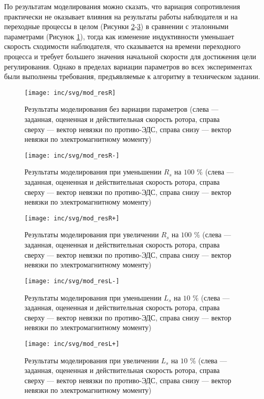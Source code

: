 По результатам моделирования можно сказать, что вариация сопротивления практически не оказывает влияния на результаты работы наблюдателя и на переходные процессы в целом (Рисунки \ref{pic:R-}-\ref{pic:R+}) в сравнении с эталонными параметрами (Рисунок \ref{pic:ideal}), тогда как изменение индуктивности уменьшает скорость сходимости наблюдателя, что сказывается на времени переходного процесса и требует большего значения начальной скорости для достижения цели регулирования. Однако в пределах вариации параметров во всех экспериментах были выполнены требования, предъявляемые к алгоритму в техническом задании.

\begin{figure}[!h]
\centering
\texttt{[image: inc/svg/mod\_resR]}
\caption{Результаты моделирования без вариации параметров (слева --- заданная, оцененная и действительная скорость ротора, справа сверху --- вектор невязки по противо-ЭДС, справа снизу --- вектор невязки по электромагнитному моменту)}
\label{pic:ideal}
\end{figure}

\begin{figure}[!h]
\centering
\texttt{[image: inc/svg/mod\_resR-]}
\caption{Результаты моделирования при уменьшении $R_s$ на $100$ \% (слева --- заданная, оцененная и действительная скорость ротора, справа сверху --- вектор невязки по противо-ЭДС, справа снизу --- вектор невязки по электромагнитному моменту)}
\label{pic:R-}
\end{figure}

\begin{figure}[!h]
\centering
\texttt{[image: inc/svg/mod\_resR+]}
\caption{Результаты моделирования при увеличении $R_s$ на $100$ \% (слева --- заданная, оцененная и действительная скорость ротора, справа сверху --- вектор невязки по противо-ЭДС, справа снизу --- вектор невязки по электромагнитному моменту)}
\label{pic:R+}
\end{figure}

\begin{figure}[!h]
\centering
\texttt{[image: inc/svg/mod\_resL-]}
\caption{Результаты моделирования при уменьшении $L_s$ на $10$ \% (слева --- заданная, оцененная и действительная скорость ротора, справа сверху --- вектор невязки по противо-ЭДС, справа снизу --- вектор невязки по электромагнитному моменту)}
\label{pic:L-}
\end{figure}

\begin{figure}[!h]
\centering
\texttt{[image: inc/svg/mod\_resL+]}
\caption{Результаты моделирования при увеличении $L_s$ на $10$ \% (слева --- заданная, оцененная и действительная скорость ротора, справа сверху --- вектор невязки по противо-ЭДС, справа снизу --- вектор невязки по электромагнитному моменту)}
\label{pic:L+}
\end{figure}
